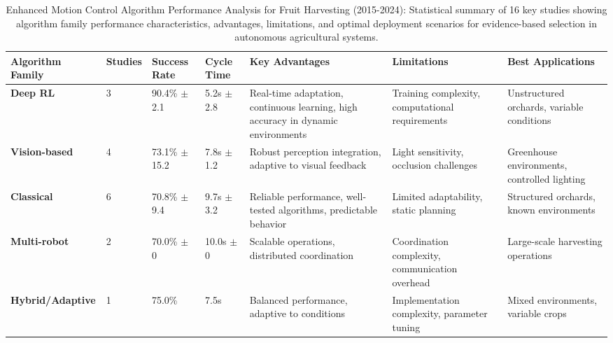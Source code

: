 \documentclass{ieeeaccess}
\begin{document}
\begin{table}[htbp]
\centering
\small
\caption{Enhanced Motion Control Algorithm Performance Analysis for Fruit Harvesting (2015-2024): Statistical summary of 16 key studies showing algorithm family performance characteristics, advantages, limitations, and optimal deployment scenarios for evidence-based selection in autonomous agricultural systems.}
\label{tab:motion_control_enhanced}
\begin{tabular}{p{2.5cm}p{1.2cm}p{1.8cm}p{2.2cm}p{2.5cm}p{2cm}p{3cm}}
\toprule
\textbf{Algorithm Family} & \textbf{Studies} & \textbf{Success Rate} & \textbf{Cycle Time} & \textbf{Key Advantages} & \textbf{Limitations} & \textbf{Best Applications} \\
\midrule
\textbf{Deep RL} & 3 & 90.4\% $\pm$ 2.1 & 5.2s $\pm$ 2.8 & Real-time adaptation, continuous learning, high accuracy in dynamic environments & Training complexity, computational requirements & Unstructured orchards, variable conditions \\
\midrule
\textbf{Vision-based} & 4 & 73.1\% $\pm$ 15.2 & 7.8s $\pm$ 1.2 & Robust perception integration, adaptive to visual feedback & Light sensitivity, occlusion challenges & Greenhouse environments, controlled lighting \\
\midrule
\textbf{Classical} & 6 & 70.8\% $\pm$ 9.4 & 9.7s $\pm$ 3.2 & Reliable performance, well-tested algorithms, predictable behavior & Limited adaptability, static planning & Structured orchards, known environments \\
\midrule
\textbf{Multi-robot} & 2 & 70.0\% $\pm$ 0 & 10.0s $\pm$ 0 & Scalable operations, distributed coordination & Coordination complexity, communication overhead & Large-scale harvesting operations \\
\midrule
\textbf{Hybrid/Adaptive} & 1 & 75.0\% & 7.5s & Balanced performance, adaptive to conditions & Implementation complexity, parameter tuning & Mixed environments, variable crops \\
\bottomrule
\end{tabular}
\end{table}
\end{document}
